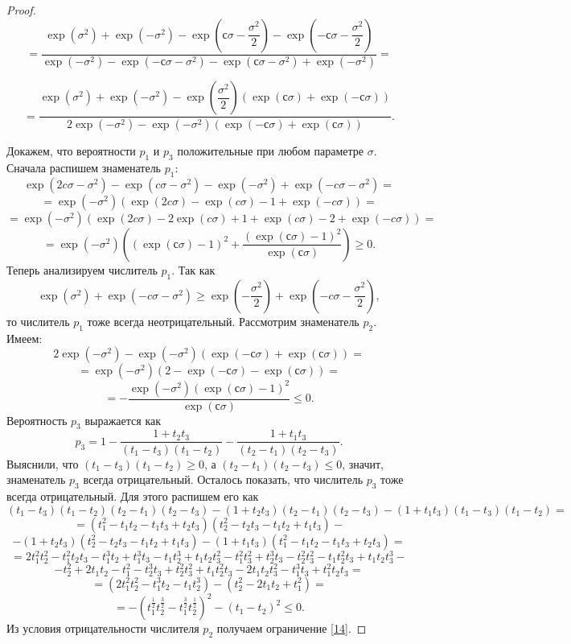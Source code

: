 \documentclass[specialist, substylefile = spbu.rtx,
subf,href,colorlinks=true, 12pt]{disser}
\begin{document}
\begin{proof}
		\[=\dfrac{\exp(\sigma^{2})+\exp(-\sigma^{2})-\exp\left( с\sigma-\dfrac{\sigma^{2}}{2}\right) -\exp\left( -с\sigma-\dfrac{\sigma^{2}}{2}\right) }{\exp(-\sigma^{2})-\exp(-с\sigma-\sigma^{2})-\exp(с\sigma-\sigma^{2})+\exp(-\sigma^{2})}=\]
		
		\[=\dfrac{\exp(\sigma^{2})+\exp(-\sigma^{2})-\exp\left( \dfrac{\sigma^{2}}{2}\right)\left(\exp(с\sigma)+\exp(-с\sigma)\right) }{2\exp(-\sigma^{2})-\exp(-\sigma^{2})\left( \exp(-с\sigma)+\exp(с\sigma)\right) }.\]
		
		Докажем, что вероятности $p_{1}$ и $p_{3}$ положительные при любом параметре $\sigma$. Сначала распишем знаменатель $p_{1}$:
		\[\exp(2c\sigma-\sigma^{2})-\exp(c\sigma-\sigma^{2})-\exp(-\sigma^{2})+\exp(-c\sigma-\sigma^{2}) = \]
		\[=\exp(-\sigma^{2})(\exp(2c\sigma)-\exp(c\sigma)-1+\exp(-c\sigma))=\]
		\[=\exp(-\sigma^{2})(\exp(2c\sigma)-2\exp(c\sigma)+1+\exp(c\sigma)-2+\exp(-c\sigma))=\]
		\[=\exp(-\sigma^{2})\left( (\exp(с\sigma)-1)^{2}+\dfrac{(\exp(с\sigma)-1)^{2}}{\exp(с\sigma)}\right) \geq 0.\]
		Теперь анализируем числитель $p_{1}$. Так как
		\[\exp(\sigma^{2})+\exp(-c\sigma-\sigma^{2})\geq \exp\left( -\dfrac{\sigma^{2}}{2}\right) +\exp\left( -c\sigma-\dfrac{\sigma^{2}}{2}\right),\]
		то числитель $p_{1}$ тоже всегда неотрицательный.
		Рассмотрим знаменатель $p_{2}$. Имеем:
		\[2\exp(-\sigma^{2})-\exp(-\sigma^{2})\left( \exp(-с\sigma)+\exp(с\sigma)\right)=\]
		\[=\exp(-\sigma^{2})(2- \exp(-с\sigma)-\exp(с\sigma))=\]
		\[=-\dfrac{\exp(-\sigma^{2})(\exp(с\sigma)-1)^{2}}{\exp(с\sigma)} \leq 0.\]
		Вероятность $p_{3}$ выражается как
		\[p_{3} = 1-\dfrac{1+t_{2}t_{3}}{(t_{1}-t_{3})(t_{1}-t_{2})}-\dfrac{1+t_{1}t_{3}}{(t_{2}-t_{1})(t_{2}-t_{3})}.\]
		Выяснили, что $(t_{1}-t_{3})(t_{1}-t_{2}) \geq 0$, а $(t_{2}-t_{1})(t_{2}-t_{3}) \leq 0$, значит, знаменатель $p_{3}$ всегда отрицательный. Осталось показать, что числитель $p_{3}$ тоже всегда отрицательный. Для этого распишем его как
		\[(t_{1}-t_{3})(t_{1}-t_{2})(t_{2}-t_{1})(t_{2}-t_{3})-(1+t_{2}t_{3})(t_{2}-t_{1})(t_{2}-t_{3})-(1+t_{1}t_{3})(t_{1}-t_{3})(t_{1}-t_{2})=\]
		\[=(t_{1}^{2}-t_{1}t_{2}-t_{1}t_{3}+t_{2}t_{3})(t_{2}^{2}-t_{2}t_{3}-t_{1}t_{2}+t_{1}t_{3})-\]
		\[-(1+t_{2}t_{3})(t_{2}^{2}-t_{2}t_{3}-t_{1}t_{2}+t_{1}t_{3})-(1+t_{1}t_{3})(t_{1}^{2}-t_{1}t_{2}-t_{1}t_{3}+t_{2}t_{3})=\]
		\[=2t_{1}^{2}t_{2}^{2}-t_{1}^{2}t_{2}t_{3}-t_{1}^{3}t_{2}+t_{1}^{3}t_{3}-t_{1}t_{2}^{3}+t_{1}t_{2}t_{3}^{2}-t_{1}^{2}t_{3}^{2}+t_{2}^{3}t_{3}-t_{2}^{2}t_{3}^{2}-t_{1}t_{2}^{2}t_{3}+t_{1}t_{2}t_{3}^{3}-\]
		\[-t_{2}^{2}+2t_{1}t_{2}-t_{1}^{2}-t_{2}^{3}t_{3}+t_{2}^{2}t_{3}^{2}+t_{1}t_{2}^{2}t_{3}-2t_{1}t_{2}t_{3}^{2}-t_{1}^{3}t_{3}+t_{1}^{2}t_{2}t_{3}=\]
		\[=(2t_{1}^{2}t_{2}^{2}-t_{1}^{3}t_{2}-t_{1}t_{2}^{3})-(t_{2}^{2}-2t_{1}t_{2}+t_{1}^{2})=\]
		\[=-(t_{1}^{\frac{1}{2}}t_{2}^{\frac{3}{2}}-t_{1}^{\frac{3}{2}}t_{2}^{\frac{1}{2}})^{2}-(t_{1}-t_{2})^{2} \leq 0.\]
		Из условия отрицательности числителя $p_{2}$ получаем ограничение \eqref{14}.
	\end{proof}
	
\end{document}
